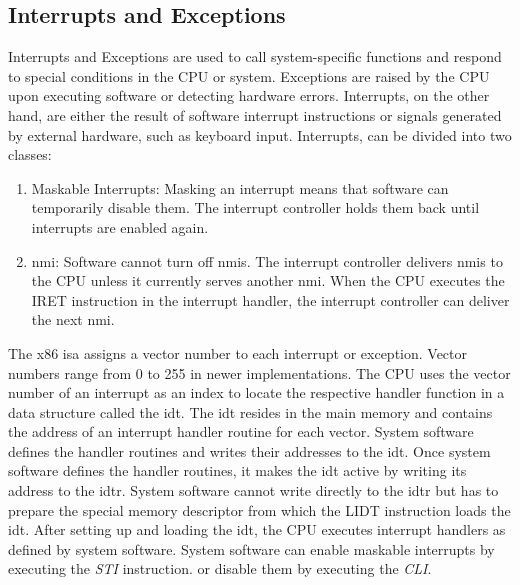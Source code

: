 \subsection{Interrupts and Exceptions}
\label{sec:state:technical:interrupts}
Interrupts and Exceptions are used to call system-specific functions and respond
to special conditions in the CPU or system. Exceptions are raised by the CPU
upon executing software or detecting hardware errors. Interrupts, on the other
hand, are either the result of software interrupt instructions or signals
generated by external hardware, such as keyboard input.
Interrupts, can be divided into two classes:
\begin{enumerate}
  \item Maskable Interrupts: Masking an interrupt means that software can
    temporarily disable them. The interrupt controller holds them back until
    interrupts are enabled again.
  \item \Gls{nmi}: Software cannot turn off \glspl{nmi}. The interrupt
    controller delivers \glspl{nmi} to the CPU unless it currently serves
    another \gls{nmi}. When the CPU executes the IRET instruction in the
    interrupt handler, the interrupt controller can deliver the next \gls{nmi}.
\end{enumerate}

The x86 \gls{isa} assigns a vector number to each interrupt or exception. Vector
numbers range from 0 to 255 in newer implementations. The CPU uses the vector
number of an interrupt as an index to locate the respective handler function in
a data structure called the \gls{idt}. The \gls{idt} resides in the main memory
and contains the address of an interrupt handler routine for each vector. System
software defines the handler routines and writes their addresses to the
\gls{idt}. Once system software defines the handler routines, it makes the
\gls{idt} active by writing its address to the \gls{idtr}. System software
cannot write directly to the \gls{idtr} but has to prepare the special memory
descriptor from which the LIDT instruction loads the \gls{idt}. After setting up
and loading the \gls{idt}, the CPU executes interrupt handlers as defined by
system software. System software can enable maskable interrupts by executing the
\textit{STI} instruction. or disable them by executing the \textit{CLI}. \\

